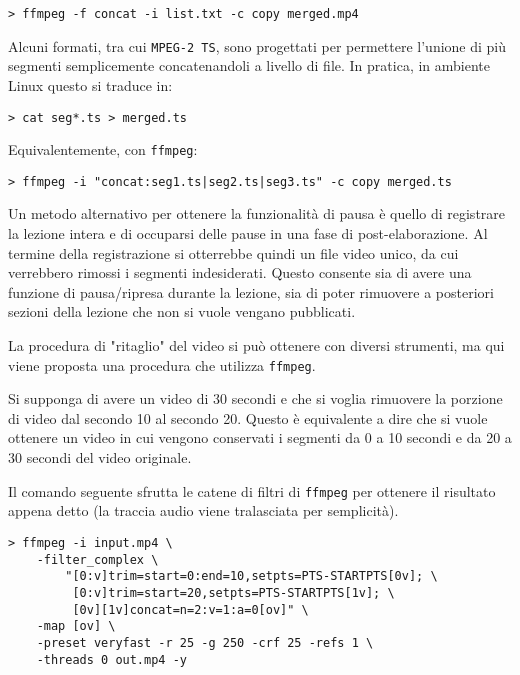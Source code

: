\begin{verbatim}
> ffmpeg -f concat -i list.txt -c copy merged.mp4
\end{verbatim}

Alcuni formati, tra cui \texttt{MPEG-2 TS}, sono progettati per permettere l'unione di più segmenti semplicemente concatenandoli a livello di file. In pratica, in ambiente Linux questo si traduce in:

\begin{verbatim}
> cat seg*.ts > merged.ts
\end{verbatim}

Equivalentemente, con \texttt{ffmpeg}:

\begin{verbatim}
> ffmpeg -i "concat:seg1.ts|seg2.ts|seg3.ts" -c copy merged.ts
\end{verbatim}

Un metodo alternativo per ottenere la funzionalità di pausa è quello di registrare la lezione intera e di occuparsi delle pause in una fase di post-elaborazione. Al termine della registrazione si otterrebbe quindi un file video unico, da cui verrebbero rimossi i segmenti indesiderati. Questo consente sia di avere una funzione di pausa/ripresa durante la lezione, sia di poter rimuovere a posteriori sezioni della lezione che non si vuole vengano pubblicati.

La procedura di "ritaglio" del video si può ottenere con diversi strumenti, ma qui viene proposta una procedura che utilizza \texttt{ffmpeg}.

Si supponga di avere un video di 30 secondi e che si voglia rimuovere la porzione di video dal secondo 10 al secondo 20. Questo è equivalente a dire che si vuole ottenere un video in cui vengono conservati i segmenti da 0 a 10 secondi e da 20 a 30 secondi del video originale.

Il comando seguente sfrutta le catene di filtri di \texttt{ffmpeg} per ottenere il risultato appena detto (la traccia audio viene tralasciata per semplicità).

\begin{verbatim}
> ffmpeg -i input.mp4 \
    -filter_complex \
        "[0:v]trim=start=0:end=10,setpts=PTS-STARTPTS[0v]; \
         [0:v]trim=start=20,setpts=PTS-STARTPTS[1v]; \
         [0v][1v]concat=n=2:v=1:a=0[ov]" \
    -map [ov] \
    -preset veryfast -r 25 -g 250 -crf 25 -refs 1 \
    -threads 0 out.mp4 -y
\end{verbatim}


